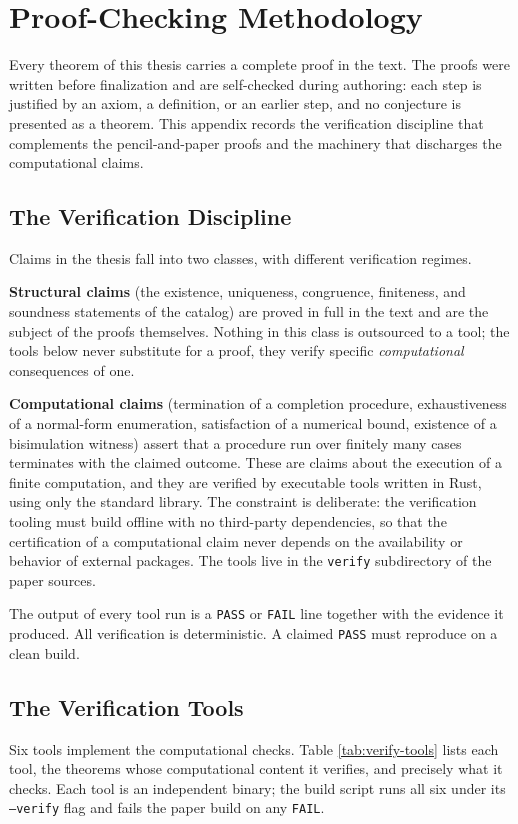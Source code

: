 \chapter{Proof-Checking Methodology}\label{app:a}

Every theorem of this thesis carries a complete proof in the text. The proofs were written before finalization and are self-checked during authoring: each step is justified by an axiom, a definition, or an earlier step, and no conjecture is presented as a theorem. This appendix records the verification discipline that complements the pencil-and-paper proofs and the machinery that discharges the computational claims.

\section{The Verification Discipline}
Claims in the thesis fall into two classes, with different verification regimes.

\textbf{Structural claims} (the existence, uniqueness, congruence, finiteness, and soundness statements of the catalog) are proved in full in the text and are the subject of the proofs themselves. Nothing in this class is outsourced to a tool; the tools below never substitute for a proof, they verify specific \emph{computational} consequences of one.

\textbf{Computational claims} (termination of a completion procedure, exhaustiveness of a normal-form enumeration, satisfaction of a numerical bound, existence of a bisimulation witness) assert that a procedure run over finitely many cases terminates with the claimed outcome. These are claims about the execution of a finite computation, and they are verified by executable tools written in Rust, using only the standard library. The constraint is deliberate: the verification tooling must build offline with no third-party dependencies, so that the certification of a computational claim never depends on the availability or behavior of external packages. The tools live in the \texttt{verify} subdirectory of the paper sources.

The output of every tool run is a \texttt{PASS} or \texttt{FAIL} line together with the evidence it produced. All verification is deterministic. A claimed \texttt{PASS} must reproduce on a clean build.

\section{The Verification Tools}
Six tools implement the computational checks. Table \ref{tab:verify-tools} lists each tool, the theorems whose computational content it verifies, and precisely what it checks. Each tool is an independent binary; the build script runs all six under its \texttt{--verify} flag and fails the paper build on any \texttt{FAIL}.

